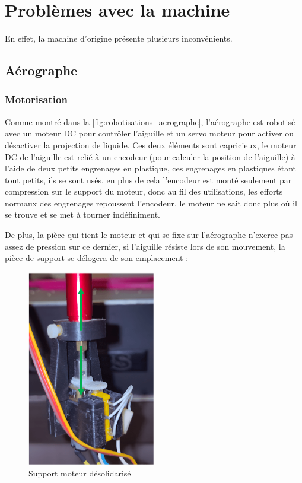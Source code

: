 \newpage
\section{Problèmes avec la machine}
En effet, la machine d'origine présente plusieurs inconvénients.
\subsection{Aérographe}
\subsubsection{Motorisation}
Comme montré dans la \autoref{fig:robotisations_aerographe}, l'aérographe est robotisé avec un moteur DC pour contrôler l'aiguille et un servo moteur pour activer
ou désactiver la projection de liquide. Ces deux éléments sont capricieux, le moteur DC de l'aiguille est relié à un encodeur (pour calculer la position de l'aiguille) à l'aide de deux petits engrenages en
plastique, ces engrenages en plastiques étant tout petits, ils se sont usés, en plus de cela l'encodeur est monté seulement par compression sur le support du moteur, donc au fil des utilisations, les efforts
normaux des engrenages repoussent l'encodeur, le moteur ne sait donc plus où il se trouve et se met à tourner indéfiniment.

De plus, la pièce qui tient le moteur et qui se fixe sur l'aérographe n'exerce pas assez de pression sur ce dernier, si l'aiguille résiste lors de son mouvement,
la pièce de support se délogera de son emplacement :

\begin{figure}[H]
  \centering
  \includegraphics[width = 0.5\textwidth]{assets/figures/situation_initiale/moteur_desolidarisation_aerographe.png}
  \caption{Support moteur désolidarisé}
\end{figure}


